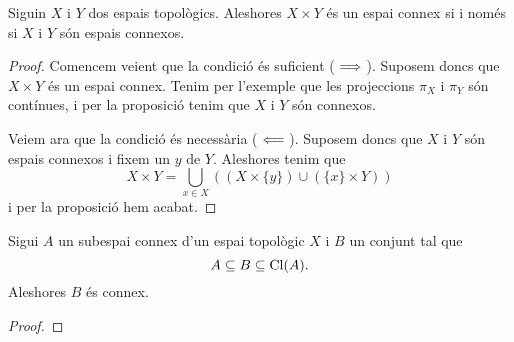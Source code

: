 \documentclass[../../Main.tex]{subfiles}
\begin{document}
	\begin{proposition}
		\label{prop:dos espais topològics són connexos si i només si el seu producte cartesià ho és}
		Siguin \(X\) i \(Y\) dos espais topològics. Aleshores \(X\times Y\) és un espai connex si i només si \(X\) i \(Y\) són espais connexos.
		\begin{proof}
			Comencem veient que la condició és suficient (\(\implies\)). Suposem doncs que \(X\times Y\) és un espai connex. Tenim per l'exemple  que les projeccions \(\pi_{X}\) i \(\pi_{Y}\) són contínues, i per la proposició  tenim que \(X\) i \(Y\) són connexos.
			
			Veiem ara que la condició és necessària (\(\impliedby\)). Suposem doncs que \(X\) i \(Y\) són espais connexos i fixem un \(y\) de \(Y\). Aleshores tenim que
			\[
			    X\times Y=\bigcup_{x\in X}\left((X\times\{y\})\cup(\{x\}\times Y)\right)
			\]
			i per la proposició  hem acabat.
		\end{proof}
	\end{proposition}
	\begin{proposition}
		\label{prop:un conjunt inclós entre un connex i la seva clausura és connex}
		Sigui \(A\) un subespai connex d'un espai topològic \(X\) i \(B\) un conjunt tal que
		\[
		    A\subseteq B\subseteq\operatorname{Cl}(A).
		\]
		Aleshores \(B\) és connex.
		\begin{proof}
		\end{proof}
	\end{proposition}
\end{document}
